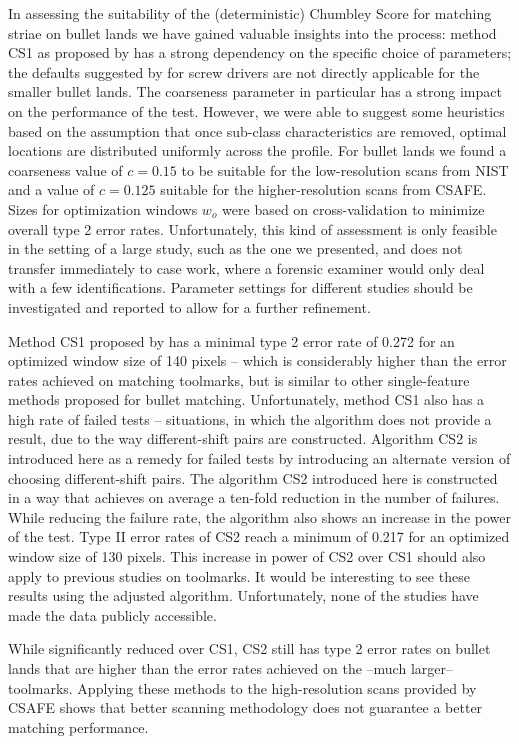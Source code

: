 \documentclass[12pt]{article}
\begin{document}
In assessing the suitability of the (deterministic) Chumbley Score for
matching striae on bullet lands we have gained valuable insights into
the process: method CS1 as proposed by \citet{hadler} has a strong
dependency on the specific choice of parameters; the defaults suggested
by \citet{hadler} for screw drivers are not directly applicable for the
smaller bullet lands. The coarseness parameter in particular has a
strong impact on the performance of the test. However, we were able to
suggest some heuristics based on the assumption that once sub-class
characteristics are removed, optimal locations are distributed uniformly
across the profile. For bullet lands we found a coarseness value of
\(c = 0.15\) to be suitable for the low-resolution scans from NIST and a
value of \(c=0.125\) suitable for the higher-resolution scans from
CSAFE. Sizes for optimization windows \(w_o\) were based on
cross-validation to minimize overall type 2 error rates. Unfortunately,
this kind of assessment is only feasible in the setting of a large
study, such as the one we presented, and does not transfer immediately
to case work, where a forensic examiner would only deal with a few
identifications. Parameter settings for different studies should be
investigated and reported to allow for a further refinement.

Method CS1 proposed by \citet{hadler} has a minimal type 2 error rate of
0.272 for an optimized window size of 140 pixels -- which is
considerably higher than the error rates achieved on matching toolmarks,
but is similar to other single-feature methods proposed for bullet
matching. Unfortunately, method CS1 also has a high rate of failed tests
-- situations, in which the algorithm does not provide a result, due to
the way different-shift pairs are constructed. Algorithm CS2 is
introduced here as a remedy for failed tests by introducing an alternate
version of choosing different-shift pairs. The algorithm CS2 introduced
here is constructed in a way that achieves on average a ten-fold
reduction in the number of failures. While reducing the failure rate,
the algorithm also shows an increase in the power of the test. Type II
error rates of CS2 reach a minimum of 0.217 for an optimized window size
of 130 pixels. This increase in power of CS2 over CS1 should also apply
to previous studies on toolmarks. It would be interesting to see these
results using the adjusted algorithm. Unfortunately, none of the studies
have made the data publicly accessible.

While significantly reduced over CS1, CS2 still has type 2 error rates
on bullet lands that are higher than the error rates achieved on the
--much larger-- toolmarks. Applying these methods to the high-resolution
scans provided by CSAFE shows that better scanning methodology does not
guarantee a better matching performance.
\end{document}
